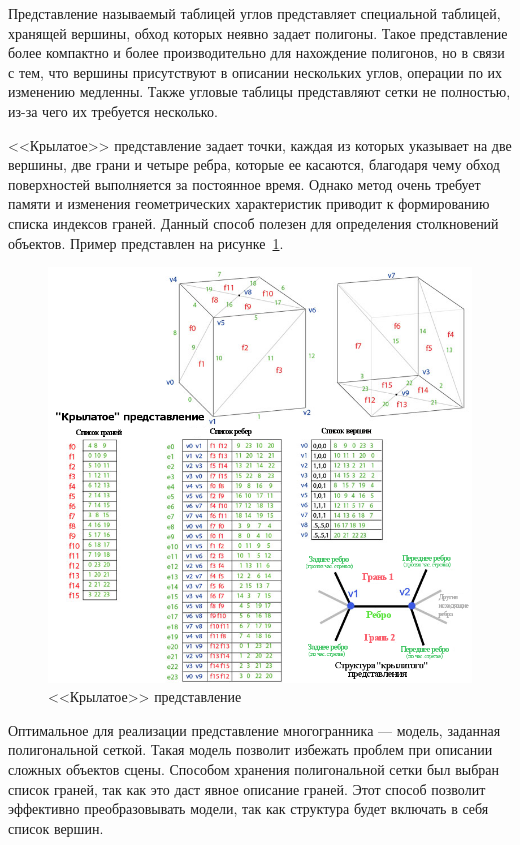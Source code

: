 Представление называемый таблицей углов представляет специальной таблицей, хранящей вершины, обход которых неявно задает полигоны. 
Такое представление более компактно и более производительно для нахождение полигонов, но в связи с тем, что вершины присутствуют в описании нескольких углов, операции по их изменению медленны. 
Также угловые таблицы представляют сетки не полностью, из-за чего их требуется несколько.

<<Крылатое>> представление задает точки, каждая из которых указывает на две вершины, две грани и четыре ребра, которые ее касаются, благодаря чему обход поверхностей выполняется за постоянное время. 
Однако метод очень требует памяти и изменения геометрических характеристик приводит к формированию списка индексов граней.
Данный способ полезен для определения столкновений объектов. 
Пример представлен на рисунке~\ref{img:winged-method}.

\begin{figure}[h]
	\centering
	\includegraphics[height=0.5\textheight]{img/winged-method.png}
	\caption{<<Крылатое>> представление}
	\label{img:winged-method}
\end{figure}

Оптимальное для реализации представление многогранника --- модель, заданная полигональной сеткой. 
Такая модель позволит избежать проблем при описании сложных объектов сцены. 
Способом хранения полигональной сетки был выбран список граней, так как это даст явное описание граней. 
Этот способ позволит эффективно преобразовывать модели, так как структура будет включать в себя список вершин.


